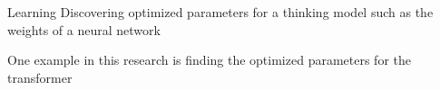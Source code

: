 \begin{frame}[allowframebreaks]{Learning}
    Discovering optimized parameters for a thinking model such as the weights of a neural network
    
    One example in this research is finding the optimized parameters for the transformer
\end{frame}